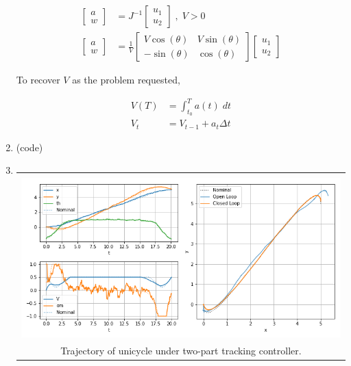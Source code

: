 \documentclass{article}
\begin{document}
\begin{enumerate}[label=(\roman*)]
	\begin{equation}
	\begin{aligned}
	\begin{bmatrix}
	a \\
	w
	\end{bmatrix}
	&=
	J^{-1}
	\begin{bmatrix}
	u_1 \\
	u_2
	\end{bmatrix} \; , \; V>0 \\
	\begin{bmatrix}
	a \\
	w
	\end{bmatrix}
	&=
	\frac{1}{V}
	\begin{bmatrix}
	V\cos(\theta) & V\sin(\theta) \\
	-\sin(\theta) & \cos(\theta)
	\end{bmatrix}
	\begin{bmatrix}
	u_1 \\
	u_2
	\end{bmatrix}
	\end{aligned}
	\end{equation}
	
	To recover $V$ as the problem requested,
	
	\begin{equation}
	\begin{aligned}
	V(T) &= \int_{t_0}^T a(t) \; dt \\
	V_t &= V_{t-1} + a_t \Delta t
	\end{aligned}
	\end{equation}
	
	\item %
	(code)
	
	\item %
	\begin{tabular}[t]{c}
	\hline \\
	\includegraphics[width=1.0\textwidth]{img/sim_traj_closedloop.png} \\
	Trajectory of unicycle under two-part tracking controller. \\
	\hline
	\end{tabular}
	
	\end{enumerate}
\end{document}
